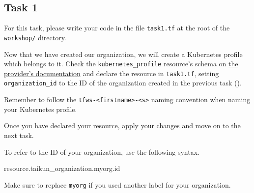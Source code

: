 \subsection{Task 1}\label{sec:task1}

\begin{note}
For this task, please write your code in the file \texttt{task1.tf}
at the root of the \texttt{workshop/} directory.
\end{note}

Now that we have created our organization,
we will create a Kubernetes profile which belongs to it.
Check the \texttt{kubernetes\_profile} resource's schema on
\href{https://intuinewin.github.io/taikun-docs/resources/kubernetes_profile.html}{the provider's documentation}
and declare the resource in \texttt{task1.tf}, setting \texttt{organization\_id} to the ID
of the organization created in the previous task ().

\begin{warn}
  Remember to follow the \texttt{tfws-<firstname>-<s>} naming convention when naming your Kubernetes profile.
\end{warn}

Once you have declared your resource, apply your changes and move on to the next task.

\begin{tip}
To refer to the ID of your organization, use the following syntax.
\begin{tf}
resource.taikun_organization.myorg.id
\end{tf}
Make sure to replace \texttt{myorg} if you used another label for your organization.
\end{tip}

